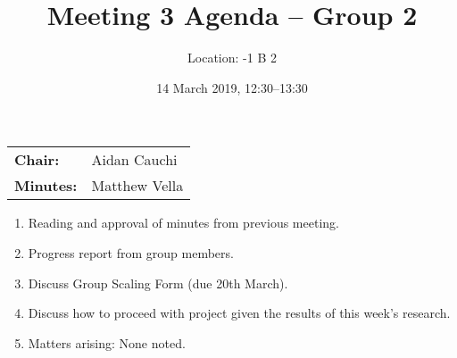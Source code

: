 \documentclass[11pt,a4paper]{article}
\title{Meeting 3 Agenda -- Group 2}
\author{Location: -1 B 2}
\date{14 March 2019, 12:30--13:30}
\begin{document}
\maketitle
\begin{center}
\begin{tabular}{ll}
\textbf{Chair:}   & Aidan Cauchi \\
\textbf{Minutes:} & Matthew Vella
\end{tabular}
\end{center}

\begin{enumerate}

\item Reading and approval of minutes from previous meeting.

\item Progress report from group members.

\item Discuss Group Scaling Form (due 20th March).

\item Discuss how to proceed with project given the results of this week's research.

\item Matters arising: None noted.

\end{enumerate}
\end{document}
